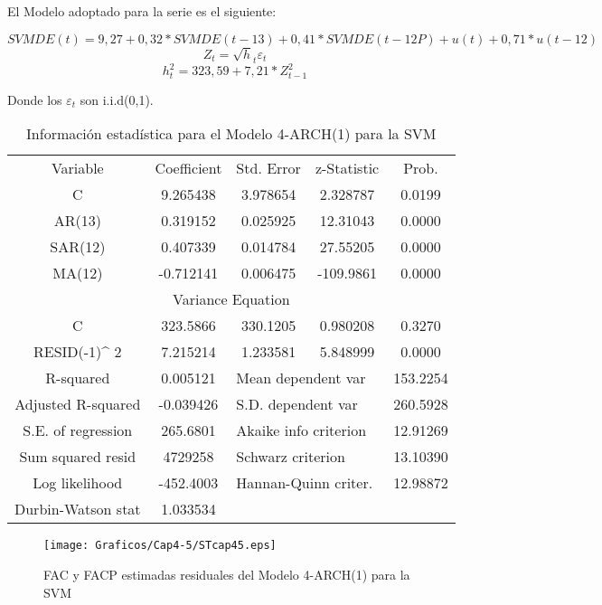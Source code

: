 \begin{observacion}
El Modelo adoptado para la serie es el siguiente: 
\end{observacion}

\[
SVMDE\left( t \right)=9,27+0,32\ast SVMDE\left( t-13 \right)+0,41\ast 
SVMDE\left( t-12P \right)+u\left( t \right)+0,71\ast u(t-12)
\]
\[
Z_{t}=\sqrt h_{t} \varepsilon_{t}
\]
\[
h_{t}^{2}=323,59+7,21\ast Z_{t-1}^{2}
\]

Donde los $\varepsilon_{t}$ son i.i.d(0,1).
 
\begin{table}[H]
\centering
\begin{tabular}{ccccc}\hline\hline
Variable & Coefficient & Std. Error & z-Statistic & Prob. \\
C & 9.265438 & 3.978654 & 2.328787 & 0.0199 \\
AR(13) & 0.319152 & 0.025925 & 12.31043 & 0.0000 \\
SAR(12) & 0.407339 & 0.014784 & 27.55205 & 0.0000 \\
MA(12) & -0.712141 & 0.006475 & -109.9861 & 0.0000 \\ \hline\hline
\multicolumn{5}{c}{Variance Equation} \\ \hline\hline
C & 323.5866 & 330.1205 & 0.980208 & 0.3270 \\
RESID(-1)$\^$ 2& 7.215214 & 1.233581 & 5.848999 & 0.0000 \\ \hline\hline
R-squared & 0.005121 & \multicolumn{2}{l}{Mean dependent var} & 153.2254 \\
Adjusted R-squared & -0.039426 & \multicolumn{2}{l}{S.D. dependent var} & 260.5928 \\
S.E. of regression & 265.6801 & \multicolumn{2}{l}{Akaike info criterion} & 12.91269 \\
Sum squared resid & 4729258& \multicolumn{2}{l}{Schwarz criterion} & 13.10390 \\
Log likelihood & -452.4003 & \multicolumn{2}{l}{Hannan-Quinn criter.} & 12.98872 \\
Durbin-Watson stat & 1.033534 &  &  &  \\ \hline\hline
\end{tabular}
\caption{Informaci\'{o}n estad\'{i}stica para el Modelo 4-ARCH(1) para la SVM}
\end{table}


\begin{figure}[H]
\centering
\texttt{[image: Graficos/Cap4-5/STcap45.eps]}
\caption{FAC y FACP estimadas residuales del Modelo 4-ARCH(1) para la SVM}
\end{figure}


